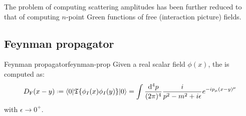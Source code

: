The problem of computing scattering amplitudes has been further reduced to that of computing $ n $-point Green functions of free (interaction picture) fields.

\subsection{Feynman propagator}

\begin{theorem}{Feynman propagator}{feynman-prop}
  Given a real scalar field $ \phi(x) $, the  is computed as:
  \begin{equation}
    D_\text{F}(x-y) \defeq \braket{0 | \tempord\{\phi_I(x) \phi_I(y)\} | 0} = \int \frac{\dd^4p}{(2\pi)^4} \frac{i}{p^2 - m^2 + i \epsilon} e^{-i p_\mu (x - y)^\mu}
    \label{eq:feynm-prop}
  \end{equation}
  with $ \epsilon \rightarrow 0^+ $.
\end{theorem}

